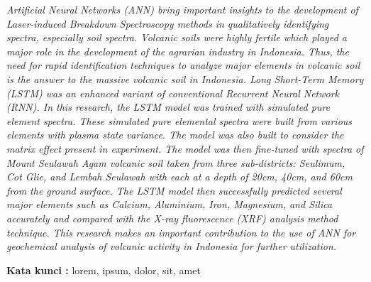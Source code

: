 \begin{abstracteng}
\textit{Artificial Neural Networks (ANN) bring important insights to the development of Laser-induced Breakdown Spectroscopy methods in qualitatively identifying spectra, especially soil spectra. Volcanic soils were highly fertile which played a major role in the development of the agrarian industry in Indonesia. Thus, the need for rapid identification techniques to analyze major elements in volcanic soil is the answer to the massive volcanic soil in Indonesia. Long Short-Term Memory (LSTM) was an enhanced variant of conventional Recurrent Neural Network (RNN). In this research, the LSTM model was trained with simulated pure element spectra. These simulated pure elemental spectra were built from various elements with plasma state variance. The model was also built to consider the matrix effect present in experiment. The model was then fine-tuned with spectra of Mount Seulawah Agam volcanic soil taken from three sub-districts: Seulimum, Cot Glie, and Lembah Seulawah with each at a depth of 20cm, 40cm, and 60cm from the ground surface. The LSTM model then successfully predicted several major elements such as Calcium, Aluminium, Iron, Magnesium, and Silica accurately and compared with the X-ray fluorescence (XRF) analysis method technique. This research makes an important contribution to the use of ANN for geochemical analysis of volcanic activity in Indonesia for further utilization.
}

\bigskip
\noindent
\textbf{Kata kunci :} lorem, ipsum, dolor, sit, amet
\end{abstracteng}

